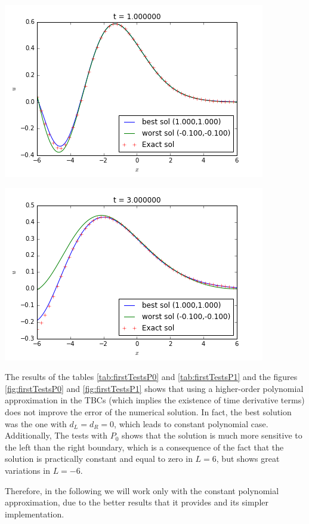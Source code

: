 \noindent\begin{minipage}{\textwidth} 
	\begin{minipage}{.5\textwidth} 
		\includegraphics[scale=.48]{figures/TBCbesse/firstTestsP0Snap2.png}	
	\end{minipage}
	\begin{minipage}{.5\linewidth}
		\includegraphics[scale=.48]{figures/TBCbesse/firstTestsP0Snap4.png}	
	\end{minipage}
\end{minipage}

\indent The results of the tables \ref{tab:firstTestsP0} and \ref{tab:firstTestsP1} and the figures \ref{fig:firstTestsP0} and \ref{fig:firstTestsP1} shows that using a higher-order polynomial approximation in the TBCs (which implies the existence of time derivative terms) does not improve the error of the numerical solution. In fact, the best solution was the one with $d_L = d_R = 0$, which leads to constant polynomial case. Additionally, The tests with $P_0$ shows that the solution is much more sensitive to the left than the right boundary, which is a consequence of the fact that the solution is practically constant and equal to zero in $L=6$, but shows great variations in $L=-6$.

\indent Therefore, in the following we will work only with the constant polynomial approximation, due to the better results that it provides and its simpler implementation.